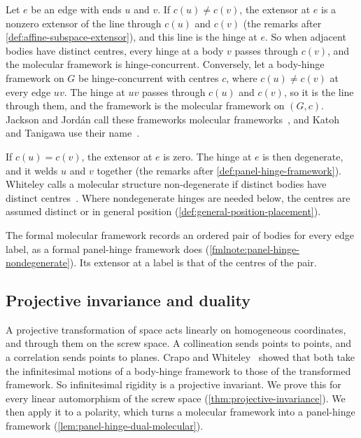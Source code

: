 Let $e$ be an edge with ends $u$ and $v$. If $c(u) \neq c(v)$, the
extensor at $e$ is a nonzero extensor of the line through $c(u)$ and
$c(v)$ (the remarks after \cref{def:affine-subspace-extensor}), and
this line is the hinge at $e$. So when adjacent bodies have distinct
centres, every hinge at a body $v$ passes through $c(v)$, and the
molecular framework is hinge-concurrent. Conversely, let a body-hinge
framework on $G$ be hinge-concurrent with centres $c$, where
$c(u) \neq c(v)$ at every edge $uv$. The hinge at $uv$ passes through
$c(u)$ and $c(v)$, so it is the line through them, and the framework is
the molecular framework on $(G, c)$. Jackson and Jord\'an call these
frameworks molecular frameworks~\cite[\S2.1]{jacksonJordan2008}, and
Katoh and Tanigawa use their name~\cite[p.~671]{katohTanigawa2011}.

If $c(u) = c(v)$, the extensor at $e$ is zero. The hinge at $e$ is then
degenerate, and it welds $u$ and $v$ together (the remarks after
\cref{def:panel-hinge-framework}). Whiteley calls a molecular structure
non-degenerate if distinct bodies have distinct
centres~\cite[Definition~4]{whiteley1999}. Where nondegenerate hinges
are needed below, the centres are assumed distinct or in general
position (\cref{def:general-position-placement}).

\begin{fmlnote}
  The formal molecular framework records an ordered pair of bodies for
  every edge label, as a formal panel-hinge framework does
  (\cref{fmlnote:panel-hinge-nondegenerate}). Its extensor at a label is
  that of the centres of the pair.
\end{fmlnote}

\subsection{Projective invariance and duality}
\label{sec:molecule-modelling-projective}

A projective transformation of space acts linearly on homogeneous
coordinates, and through them on the screw space. A collineation sends
points to points, and a correlation sends points to planes. Crapo and
Whiteley~\cite[\S3.6]{crapoWhiteley1982} showed that both take the
infinitesimal motions of a body-hinge framework to those of the
transformed framework. So infinitesimal rigidity is a projective
invariant. We prove this for every linear automorphism of the screw
space (\cref{thm:projective-invariance}). We then apply it to a
polarity, which turns a molecular framework into a panel-hinge framework
(\cref{lem:panel-hinge-dual-molecular}).

